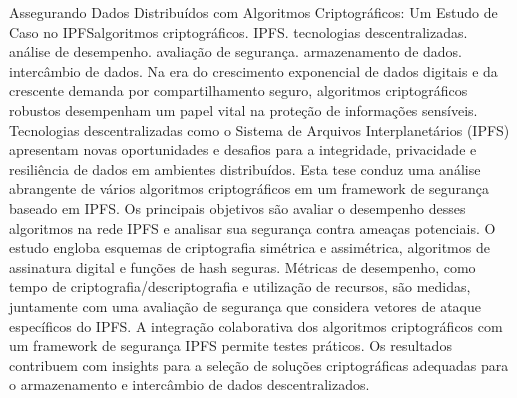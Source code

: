 \documentclass[cic,tc,english]{iiufrgs}
\begin{document}
\begin{abstract}
    In the era of exponential digital data growth and increasing demand for secure data sharing, robust cryptographic algorithms play a vital role in safeguarding sensitive information. Decentralized technologies like the InterPlanetary File System (IPFS) present new opportunities and challenges for data integrity, privacy, and resilience in distributed environments. This thesis conducts a comprehensive analysis of various cryptographic algorithms within an IPFS-based security framework. The primary objectives are to assess the performance of these algorithms in the IPFS network and evaluate their security against potential threats. The study encompasses symmetric and asymmetric encryption schemes, digital signature algorithms, and secure hashing functions. Performance metrics, including encryption/decryption time and resource utilization, are measured, alongside a security evaluation considering IPFS-specific attack vectors. Collaboratively integrating the cryptographic algorithms with an IPFS security framework allows practical testing. The findings contribute insights into selecting appropriate cryptographic solutions for decentralized data storage and exchange.
\end{abstract}

\begin{englishabstract}{Assegurando Dados Distribuídos com Algoritmos Criptográficos: Um Estudo de Caso no IPFS}{algoritmos criptográficos. IPFS. tecnologias descentralizadas. análise de desempenho. avaliação de segurança. armazenamento de dados. intercâmbio de dados.
}
    Na era do crescimento exponencial de dados digitais e da crescente demanda por compartilhamento seguro, algoritmos criptográficos robustos desempenham um papel vital na proteção de informações sensíveis. Tecnologias descentralizadas como o Sistema de Arquivos Interplanetários (IPFS) apresentam novas oportunidades e desafios para a integridade, privacidade e resiliência de dados em ambientes distribuídos. Esta tese conduz uma análise abrangente de vários algoritmos criptográficos em um framework de segurança baseado em IPFS. Os principais objetivos são avaliar o desempenho desses algoritmos na rede IPFS e analisar sua segurança contra ameaças potenciais. O estudo engloba esquemas de criptografia simétrica e assimétrica, algoritmos de assinatura digital e funções de hash seguras. Métricas de desempenho, como tempo de criptografia/descriptografia e utilização de recursos, são medidas, juntamente com uma avaliação de segurança que considera vetores de ataque específicos do IPFS. A integração colaborativa dos algoritmos criptográficos com um framework de segurança IPFS permite testes práticos. Os resultados contribuem com insights para a seleção de soluções criptográficas adequadas para o armazenamento e intercâmbio de dados descentralizados.
\end{englishabstract}
\end{document}
